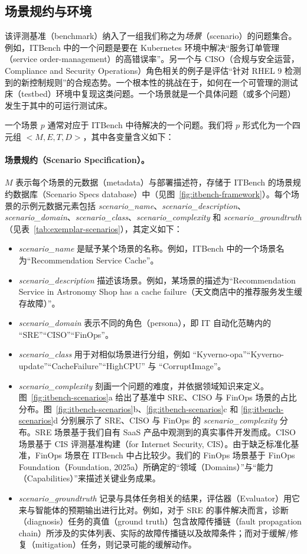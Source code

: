 \documentclass[10pt,UTF8,fontset=fandol]{ctexart}
\begin{document}
\subsection{场景规约与环境}

该评测基准（benchmark）纳入了一组我们称之为\emph{场景}（scenario）的问题集合。例如，ITBench 中的一个问题是要在 Kubernetes 环境中解决“服务订单管理（service order-management）的高错误率”。另一个与 CISO（合规与安全运营，Compliance and Security Operations）角色相关的例子是评估“针对 RHEL 9 检测到的新控制规则”的合规态势。一个根本性的挑战在于，如何在一个可管理的测试床（testbed）环境中复现这类问题。一个场景就是一个具体问题（或多个问题）发生于其中的可运行测试床。

一个场景 $p$ 通常对应于 ITBench 中待解决的一个问题。我们将 $p$ 形式化为一个四元组 $<M, E, T, D>$，其中各变量含义如下：

\paragraph{场景规约（Scenario Specification）。} $M$ 表示每个场景的元数据（metadata）与部署描述符，存储于 ITBench 的场景规约数据库（Scenario Specs database）中（见图~\ref{fig:itbench-framework}）。每个场景的示例元数据元素包括 \emph{scenario\_name}、\emph{scenario\_description}、\emph{scenario\_domain}、\emph{scenario\_class}、\emph{scenario\_complexity} 和 \emph{scenario\_groundtruth}（见表~\ref{tab:exemplar-scenarios}），其定义如下：

\begin{itemize}
\item \emph{scenario\_name} 是赋予某个场景的名称。例如，ITBench 中的一个场景名为“Recommendation Service Cache”。
\item \emph{scenario\_description} 描述该场景。例如，某场景的描述为“Recommendation Service in Astronomy Shop has a cache failure（天文商店中的推荐服务发生缓存故障）”。
\item \emph{scenario\_domain} 表示不同的角色（persona），即 IT 自动化范畴内的 “SRE”“CISO”“FinOps”。
\item \emph{scenario\_class} 用于对相似场景进行分组，例如 “Kyverno-opa”“Kyverno-update”“CacheFailure”“HighCPU” 与 “CorruptImage”。
\item \emph{scenario\_complexity} 刻画一个问题的难度，并依据领域知识来定义。图~\ref{fig:itbench-scenarios}a 给出了基准中 SRE、CISO 与 FinOps 场景的占比分布。图~\ref{fig:itbench-scenarios}b、\ref{fig:itbench-scenarios}c 和 \ref{fig:itbench-scenarios}d 分别展示了 SRE、CISO 与 FinOps 的 \emph{scenario\_complexity} 分布。SRE 场景基于我们自有 SaaS 产品中观测到的真实事件开发而成。CISO 场景基于 CIS 评测基准构建（for Internet Security, CIS）。由于缺乏标准化基准，FinOps 场景在 ITBench 中占比较少。我们的 FinOps 场景基于 FinOps Foundation（Foundation, 2025a）所确定的“领域（Domains）”与“能力（Capabilities）”来描述关键业务成果。
\item \emph{scenario\_groundtruth} 记录与具体任务相关的结果，评估器（Evaluator）用它来与智能体的预期输出进行比对。例如，对于 SRE 的事件解决而言，诊断（diagnosis）任务的真值（ground truth）包含故障传播链（fault propagation chain）所涉及的实体列表、实际的故障传播链以及故障条件；而对于缓解/修复（mitigation）任务，则记录可能的缓解动作。
\end{itemize}
\end{document}
